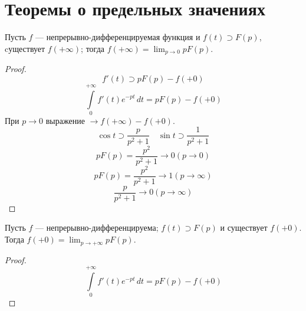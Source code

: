 \section{Теоремы о предельных значениях}
\begin{theorem}
Пусть $f$ --- непрерывно-дифференцируемая функция и \(f(t) \supset F(p)\), cуществует \(f(+\infty)\); тогда \(f(+\infty) = \lim_{p \rightarrow 0} pF(p)\).
\end{theorem}
\begin{proof}
 \[
 	f'(t) \supset pF(p) - f(+0)
 \]
 \[
 	\int \limits_0^{+\infty}f'(t)e^{-pt} \, dt = pF(p)-f(+0)
 \]
 При \(p \rightarrow 0\) выражение \(\rightarrow f(+\infty)-f(+0)\).\\
 
 \[
 	\cos t \supset \dfrac{p}{p^2+1} \quad \sin t \supset \dfrac{1}{p^2+1} 
 \]
 \[
 	pF(p) = \dfrac{p^2}{p^2+1} \rightarrow 0 (p\rightarrow0)
 \]
  \[
 	pF(p) = \dfrac{p^2}{p^2+1} \rightarrow 1 (p\rightarrow \infty)
 \]
   \[
 	\dfrac{p}{p^2+1} \rightarrow 0 (p\rightarrow \infty)
 \]
 \end{proof}
 \begin{theorem}
 Пусть $f$ --- непрерывно-дифференцируема;  \(f(t) \supset F(p)\) и существует \(f(+0)\). 
 Тогда \(f(+0) = \lim_{p\rightarrow +\infty} pF(p)\).
 \end{theorem}
 \begin{proof}
 \[
 	\int \limits_0^{+\infty} f'(t) e^{-pt}\, dt = pF(p) - f(+0)
 \]
\end{proof}
\clearpage
